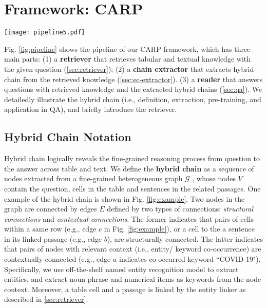 \documentclass[11pt]{article}
\begin{document}
	\section{Framework: CARP}
	\begin{figure*}[thbp]
		\centering
		\texttt{[image: pipeline5.pdf]}
		\caption{Overview of our system. Retriever (\cref{sec:retriever}) first retrieves knowledge from the corpus for the question. 
		Secondly, hybrid chain extractor (\cref{sec:ec-extractor}) extracts hybrid chains from the knowledge, which is improved by pre-training (\cref{sec:ec-pretrain}). 
		Finally, reader (\cref{sec:qa}) answers the questions with retrieved evidence and extracted hybrid chain. }
		\label{fig:pipeline}
	\end{figure*}
	Fig. \ref{fig:pipeline} shows the pipeline of our CARP framework, which has three main parts: 
	(1) a \textbf{retriever} that retrieves tabular and textual knowledge with the given question (\cref{sec:retriever});
	(2) a \textbf{chain extractor} that extracts hybrid chain from the retrieved knowledge (\cref{sec:ec-extractor}).
	(3) a \textbf{reader} that answers questions with retrieved knowledge and the extracted hybrid chains (\cref{sec:qa}).
	We detailedly illustrate the hybrid chain (i.e., definition, extraction, pre-training, and application in QA), and briefly introduce the retriever.
	\subsection{Hybrid Chain Notation}
	Hybrid chain logically reveals the fine-grained reasoning process from question to the answer across table and text.
	We define the \textbf{hybrid chain} as a sequence of nodes extracted from a fine-grained heterogeneous graph $\mathcal{G}$ , whose nodes $V$ contain the question, cells in the table and sentences in the related passages. 
One example of the hybrid chain is shown in Fig. \ref{fig:example}. 
	Two nodes in the graph are connected by edges $E$ defined by two types of connections: \textit{structural connections} and \textit{contextual connections}. 
	The former indicates that pairs of cells within a same row (e.g., edge $c$ in Fig. \ref{fig:example}), or a cell to the a sentence in its linked passage (e.g., edge $b$), are structurally connected. 
	The latter indicates that pairs of nodes with relevant context (i.e., entity/ keyword co-occurrence) are contextually connected (e.g., edge $a$ indicates co-occurred keyword ``COVID-19").
	Specifically, we use off-the-shelf named entity recognition model \cite{Peters2017SemisupervisedST} to extract entities, and extract noun phrase and numerical items as keywords from the node context. Moreover, a table cell and a passage is linked by the entity linker as described in \cref{sec:retriever}.
\end{document}
